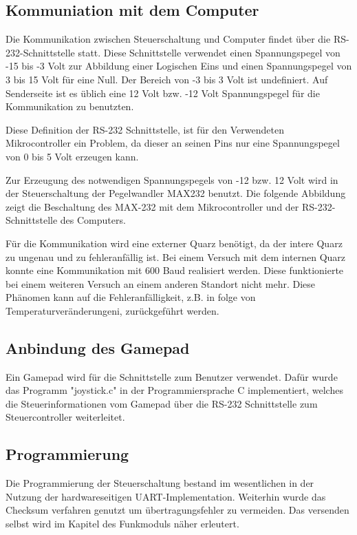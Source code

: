 \documentclass{scrartcl}
\begin{document}
	\subsection{Kommuniation mit dem Computer} %
		Die Kommunikation zwischen Steuerschaltung und Computer findet über die RS-232-Schnittstelle statt.
		Diese Schnittstelle verwendet einen Spannungspegel von -15 bis -3 Volt zur Abbildung einer Logischen Eins 
		und einen Spannungspegel von 3 bis 15 Volt für eine Null.
		Der Bereich von -3 bis 3 Volt ist undefiniert.
		Auf Senderseite ist es üblich eine 12 Volt bzw. -12 Volt Spannungspegel für die Kommunikation zu benutzten.

		Diese Definition der RS-232 Schnittstelle, ist für den Verwendeten Mikrocontroller ein Problem,
		da dieser an seinen Pins nur eine Spannungspegel von 0 bis 5 Volt erzeugen kann.

		Zur Erzeugung des notwendigen Spannungspegels von -12 bzw. 12 Volt wird in der Steuerschaltung der Pegelwandler MAX232 benutzt.
		Die folgende Abbildung zeigt die Beschaltung des MAX-232 mit dem Mikrocontroller und der RS-232-Schnittstelle des Computers.

		Für die Kommunikation wird eine externer Quarz benötigt, da der intere Quarz zu ungenau und zu fehleranfällig ist.
		Bei einem Versuch mit dem internen Quarz konnte eine Kommunikation mit 600 Baud realisiert werden.
		Diese funktionierte bei einem weiteren Versuch an einem anderen Standort nicht mehr.
		Diese Phänomen kann auf die Fehleranfälligkeit, z.B. in folge von Temperaturveränderungeni, zurückgeführt werden.

	\subsection{Anbindung des Gamepad} %
		Ein Gamepad wird für die Schnittstelle zum Benutzer verwendet.
		Dafür wurde das Programm "joystick.c" in der Programmiersprache C implementiert,
		welches die Steuerinformationen vom Gamepad über die RS-232 Schnittstelle zum Steuercontroller weiterleitet.
	
	\subsection{Programmierung}
		Die Programmierung der Steuerschaltung bestand im wesentlichen in der Nutzung der hardwareseitigen UART-Implementation.
		Weiterhin wurde das Checksum verfahren genutzt um übertragungsfehler zu vermeiden.
		Das versenden selbst wird im Kapitel des Funkmoduls näher erleutert.
\newpage
\end{document}
